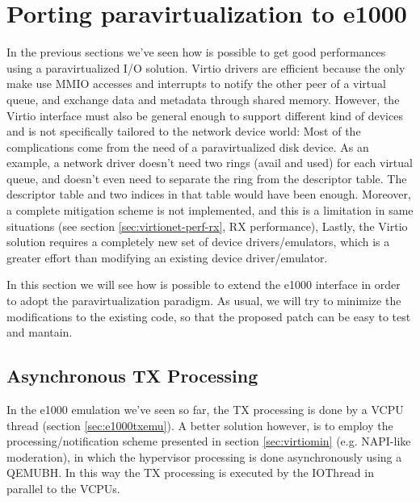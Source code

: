 \section{Porting paravirtualization to e1000}
In the previous sections we've seen how is possible to get good performances using a paravirtualized I/O solution. Virtio drivers are
efficient because the only make use MMIO accesses and interrupts to notify the other peer of a virtual queue, and exchange data and
metadata through shared memory.
However, the Virtio interface must also be general enough to support different kind of devices and is not specifically tailored to the
network device world: Most of the complications come from the need of a paravirtualized disk device. As an example, a network driver
doesn't need two rings (avail and used) for each virtual queue, and doesn't even need to separate the ring from the descriptor table. The
descriptor table and two indices in that table would have been enough.
Moreover, a complete mitigation scheme is not implemented, and this is a limitation in same situations (see section
\ref{sec:virtionet-perf-rx}, RX performance),
Lastly, the Virtio solution requires a completely new set of device drivers/emulators, which is a greater effort than modifying
an existing device driver/emulator.

\vspace{0.5cm}

In this section we will see how is possible to extend the e1000 interface in order to adopt the paravirtualization paradigm.
As usual, we will try to minimize the modifications to the existing code, so that the proposed patch can be easy to test and mantain.


\subsection{Asynchronous TX Processing}
\label{sec:e1000-par-async}
In the e1000 emulation we've seen so far, the TX processing is done by a VCPU thread (section \ref{sec:e1000txemu}).
A better solution however, is to employ the processing/notification scheme presented in section \ref{sec:virtiomin} (e.g. NAPI-like 
moderation), in which the hypervisor processing is done asynchronously using a QEMUBH.
In this way the TX processing is executed by the IOThread in parallel to the VCPUs.


